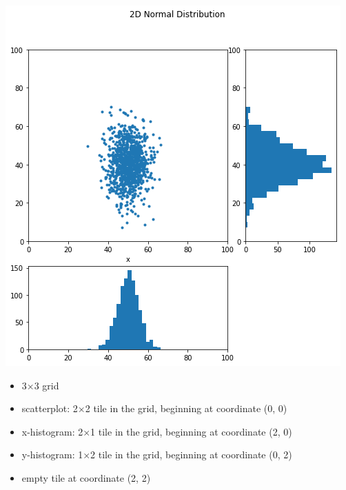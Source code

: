 
\begin{frame}
%
\begin{tcolorbox}[title=2D Normal Distribution]
\begin{center}
	\begin{minipage}{.45\linewidth}
	\includegraphics[width=\linewidth]{./gfx/plt-gauss2d}	
	\end{minipage}
	\begin{minipage}{.5\linewidth}
	\begin{itemize}
	\item 3$\times$3 grid
	\item scatterplot: 2$\times$2 tile in the grid, beginning at coordinate (0, 0)
	\item x-histogram: 2$\times$1 tile in the grid, beginning at coordinate (2, 0)
	\item y-histogram: 1$\times$2 tile in the grid, beginning at coordinate (0, 2)
	\item empty tile at coordinate (2, 2)
	\end{itemize}
	\end{minipage}
\end{center}
\end{tcolorbox}
%
\end{frame}

